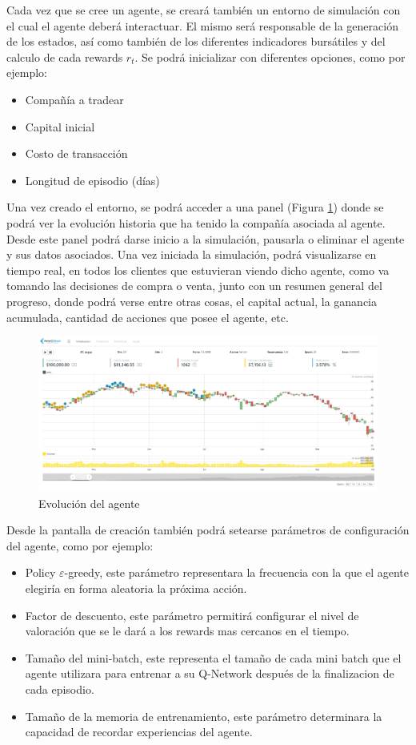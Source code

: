 Cada vez que se cree un agente, se creará también un entorno de simulación con el cual el agente deberá interactuar. El mismo será responsable de la generación de los estados, así como también de los diferentes indicadores bursátiles y del calculo de cada rewards $r_t$. Se podrá inicializar con diferentes opciones, como por ejemplo:

\begin{itemize}
	\item Compañía a tradear
	\item Capital inicial
	\item Costo de transacción
	\item Longitud de episodio (días)
\end{itemize}


Una vez creado el entorno, se podrá acceder a una panel (Figura \ref{fig:cap4:3}) donde se podrá ver la evolución historia que ha tenido la compañía asociada al agente. Desde este panel podrá darse inicio a la simulación, pausarla o eliminar el agente y sus datos asociados. 
Una vez iniciada la simulación, podrá visualizarse en tiempo real, en todos los clientes que estuvieran viendo dicho agente, como va tomando las decisiones de compra o venta, junto con un resumen general del progreso, donde podrá verse
entre otras cosas, el capital actual, la ganancia acumulada, cantidad de acciones que posee el agente, etc.

\begin{figure}[h!]
	\includegraphics[scale=0.3]{imagenes/screen4.png}
	\caption{Evolución del agente}
		\label{fig:cap4:3}
\end{figure}


Desde la pantalla de creación también podrá setearse parámetros de configuración del agente, como por ejemplo:
\begin{itemize}
	\item Policy $\varepsilon$-greedy, este parámetro representara la frecuencia con la que el agente elegiría en forma aleatoria la próxima acción.
	\item Factor de descuento, este parámetro permitirá configurar el nivel de valoración que se le dará a los rewards mas cercanos en el tiempo.
	\item Tamaño del mini-batch, este representa el tamaño de cada mini batch que el agente utilizara para entrenar a su Q-Network después de la finalizacion de cada episodio.
	\item Tamaño de la memoria de entrenamiento, este parámetro determinara la capacidad de recordar experiencias del agente.
\end{itemize}

